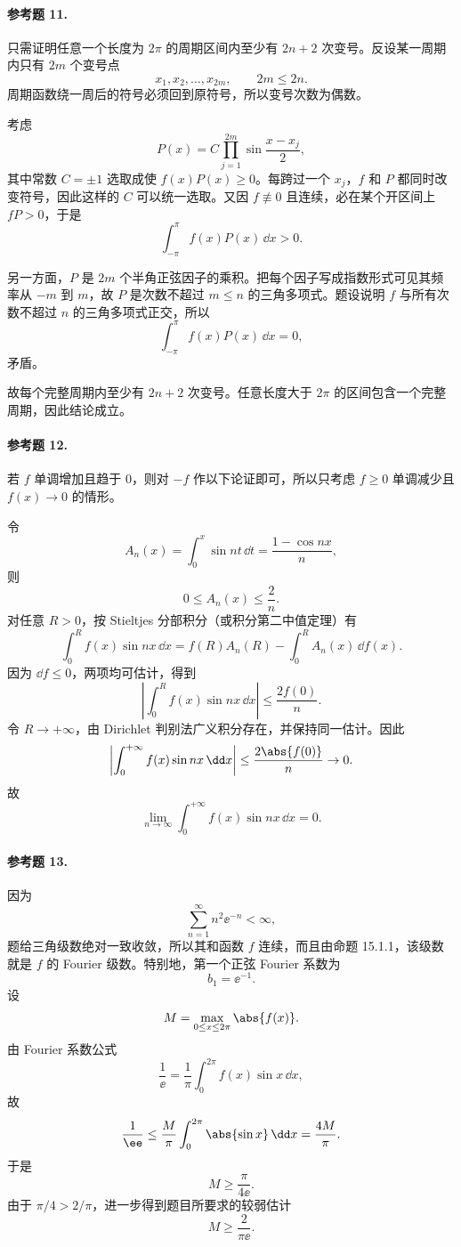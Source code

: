 \paragraph{参考题 11.}
\begin{xsolution}
只需证明任意一个长度为 $2\pi$ 的周期区间内至少有 $2n+2$ 次变号。反设某一周期内只有 $2m$ 个变号点
\[
  x_1,x_2,\ldots,x_{2m},\qquad 2m\le2n.
\]
周期函数绕一周后的符号必须回到原符号，所以变号次数为偶数。

考虑
\[
  P(x)=C\prod_{j=1}^{2m}\sin\frac{x-x_j}{2},
\]
其中常数 $C=\pm1$ 选取成使 $f(x)P(x)\ge0$。每跨过一个 $x_j$，$f$ 和 $P$ 都同时改变符号，因此这样的 $C$ 可以统一选取。又因 $f\not\equiv0$ 且连续，必在某个开区间上 $fP>0$，于是
\[
  \int_{-\pi}^{\pi}f(x)P(x)\,\dd x>0.
\]

另一方面，$P$ 是 $2m$ 个半角正弦因子的乘积。把每个因子写成指数形式可见其频率从 $-m$ 到 $m$，故 $P$ 是次数不超过 $m\le n$ 的三角多项式。题设说明 $f$ 与所有次数不超过 $n$ 的三角多项式正交，所以
\[
  \int_{-\pi}^{\pi}f(x)P(x)\,\dd x=0,
\]
矛盾。

故每个完整周期内至少有 $2n+2$ 次变号。任意长度大于 $2\pi$ 的区间包含一个完整周期，因此结论成立。
\end{xsolution}

\paragraph{参考题 12.}
\begin{xsolution}
若 $f$ 单调增加且趋于 $0$，则对 $-f$ 作以下论证即可，所以只考虑 $f\ge0$ 单调减少且 $f(x)\to0$ 的情形。

令
\[
  A_n(x)=\int_0^x\sin nt\,\dd t=\frac{1-\cos nx}{n},
\]
则
\[
  0\le A_n(x)\le\frac2n.
\]
对任意 $R>0$，按 Stieltjes 分部积分（或积分第二中值定理）有
\[
  \int_0^Rf(x)\sin nx\,\dd x
  =f(R)A_n(R)-\int_0^RA_n(x)\,\dd f(x).
\]
因为 $\dd f\le0$，两项均可估计，得到
\[
  \left|\int_0^Rf(x)\sin nx\,\dd x\right|
  \le\frac{2f(0)}n.
\]
令 $R\to+\infty$，由 Dirichlet 判别法广义积分存在，并保持同一估计。因此
\[
  \left|\int_0^{+\infty}f(x)\sin nx\,\dd x\right|
  \le\frac{2\abs{f(0)}}n\to0.
\]
故
\[
  \boxed{\displaystyle
  \lim_{n\to\infty}\int_0^{+\infty}f(x)\sin nx\,\dd x=0 }.
\]
\end{xsolution}

\paragraph{参考题 13.}
\begin{xsolution}
因为
\[
  \sum_{n=1}^{\infty}n^2\ee^{-n}<\infty,
\]
题给三角级数绝对一致收敛，所以其和函数 $f$ 连续，而且由命题 15.1.1，该级数就是 $f$ 的 Fourier 级数。特别地，第一个正弦 Fourier 系数为
\[
  b_1=\ee^{-1}.
\]
设
\[
  M=\max_{0\le x\le2\pi}\abs{f(x)}.
\]
由 Fourier 系数公式
\[
  \frac1\ee
  =\frac1\pi\int_0^{2\pi}f(x)\sin x\,\dd x,
\]
故
\[
  \frac1\ee
  \le\frac{M}{\pi}\int_0^{2\pi}\abs{\sin x}\,\dd x
  =\frac{4M}{\pi}.
\]
于是
\[
  M\ge\frac{\pi}{4\ee}.
\]
由于 $\pi/4>2/\pi$，进一步得到题目所要求的较弱估计
\[
  \boxed{\displaystyle
  M\ge\frac2{\pi\ee}}.
\]
\end{xsolution}

